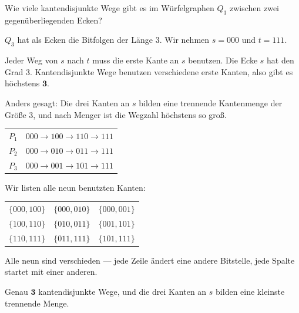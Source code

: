 \begin{aufgabe}
Wie viele kantendisjunkte Wege gibt es im Würfelgraphen $Q_3$ zwischen zwei gegenüberliegenden Ecken?

\loesung
{}
$Q_3$ hat als Ecken die Bitfolgen der Länge $3$. Wir nehmen $s = 000$ und $t = 111$.

Jeder Weg von $s$ nach $t$ muss die erste Kante an $s$ benutzen. Die Ecke $s$ hat den Grad $3$. Kantendisjunkte Wege benutzen verschiedene erste Kanten, also gibt es höchstens $\mathbf{3}$.

Anders gesagt: Die drei Kanten an $s$ bilden eine trennende Kantenmenge der Größe $3$, und nach Menger ist die Wegzahl höchstens so groß.

\begin{center}
{\small
\renewcommand{\arraystretch}{1.4}
\begin{tabular}{@{}P{1.0cm}P{5.6cm}@{}}
\toprule
$P_1$ & $000 \to 100 \to 110 \to 111$\\
$P_2$ & $000 \to 010 \to 011 \to 111$\\
$P_3$ & $000 \to 001 \to 101 \to 111$\\
\bottomrule
\end{tabular}}
\end{center}

Wir listen alle neun benutzten Kanten:
\begin{center}
{\small
\renewcommand{\arraystretch}{1.32}
\begin{tabular}{@{}P{2.4cm}P{2.4cm}P{2.4cm}@{}}
\toprule
$\{000,100\}$ & $\{000,010\}$ & $\{000,001\}$\\
$\{100,110\}$ & $\{010,011\}$ & $\{001,101\}$\\
$\{110,111\}$ & $\{011,111\}$ & $\{101,111\}$\\
\bottomrule
\end{tabular}}
\end{center}
Alle neun sind verschieden --- jede Zeile ändert eine andere Bitstelle, jede Spalte startet mit einer anderen. \checkmark

Genau $\mathbf{3}$ kantendisjunkte Wege, und die drei Kanten an $s$ bilden eine kleinste trennende Menge.

\begin{center}
\begin{minipage}{0.86\textwidth}
\end{minipage}
\end{center}
\end{aufgabe}

